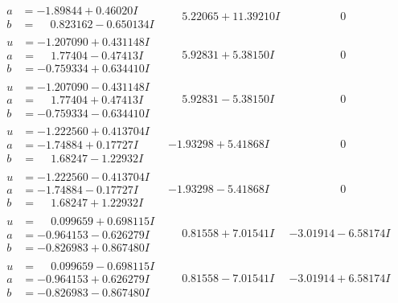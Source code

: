 \documentclass[1p]{elsarticle_modified}
\theoremstyle{definition}
\begin{document}
$$\begin{array}{c|c|c}
\begin{aligned}
a &= -1.89844 + 0.46020 I \\
b &= \phantom{-}0.823162 - 0.650134 I\end{aligned}
 & \phantom{-}5.22065 + 11.39210 I & \phantom{-0.000000 } 0 \\ \hline\begin{aligned}
u &= -1.207090 + 0.431148 I \\
a &= \phantom{-}1.77404 - 0.47413 I \\
b &= -0.759334 + 0.634410 I\end{aligned}
 & \phantom{-}5.92831 + 5.38150 I & \phantom{-0.000000 } 0 \\ \hline\begin{aligned}
u &= -1.207090 - 0.431148 I \\
a &= \phantom{-}1.77404 + 0.47413 I \\
b &= -0.759334 - 0.634410 I\end{aligned}
 & \phantom{-}5.92831 - 5.38150 I & \phantom{-0.000000 } 0 \\ \hline\begin{aligned}
u &= -1.222560 + 0.413704 I \\
a &= -1.74884 + 0.17727 I \\
b &= \phantom{-}1.68247 - 1.22932 I\end{aligned}
 & -1.93298 + 5.41868 I & \phantom{-0.000000 } 0 \\ \hline\begin{aligned}
u &= -1.222560 - 0.413704 I \\
a &= -1.74884 - 0.17727 I \\
b &= \phantom{-}1.68247 + 1.22932 I\end{aligned}
 & -1.93298 - 5.41868 I & \phantom{-0.000000 } 0 \\ \hline\begin{aligned}
u &= \phantom{-}0.099659 + 0.698115 I \\
a &= -0.964153 - 0.626279 I \\
b &= -0.826983 + 0.867480 I\end{aligned}
 & \phantom{-}0.81558 + 7.01541 I & -3.01914 - 6.58174 I \\ \hline\begin{aligned}
u &= \phantom{-}0.099659 - 0.698115 I \\
a &= -0.964153 + 0.626279 I \\
b &= -0.826983 - 0.867480 I\end{aligned}
 & \phantom{-}0.81558 - 7.01541 I & -3.01914 + 6.58174 I \\ \hline\begin{aligned}

\end{aligned}
\end{array}$$
\end{document}
